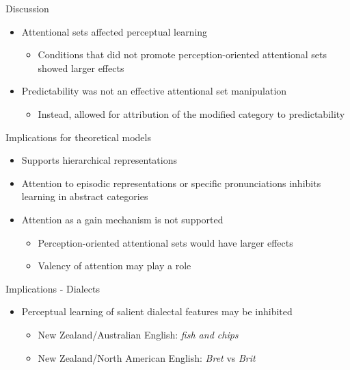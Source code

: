 \documentclass{beamer}
\begin{document}
\begin{frame}{Discussion}

\begin{itemize}
\item Attentional sets affected perceptual learning
\begin{itemize}
\item Conditions that did not promote perception-oriented attentional sets showed larger effects
\end{itemize}
\item Predictability was not an effective attentional set manipulation
\begin{itemize}
\item Instead, allowed for attribution of the modified category to predictability
\end{itemize}
\end{itemize}

\end{frame}

\begin{frame}{Implications for theoretical models}

\begin{itemize}
\item Supports hierarchical representations
\item Attention to episodic representations or specific pronunciations inhibits learning in abstract categories
\item Attention as a gain mechanism is not supported
\begin{itemize}
\item Perception-oriented attentional sets would have larger effects
\item Valency of attention may play a role
\end{itemize}
\end{itemize}
\end{frame}

\begin{frame}{Implications - Dialects}

\begin{itemize}
\item Perceptual learning of salient dialectal features may be inhibited
\begin{itemize}
\item New Zealand/Australian English: \emph{fish and chips}
\item New Zealand/North American English: \emph{Bret} vs \emph{Brit}
\end{itemize}
\end{itemize}


\end{frame}
\end{document}
